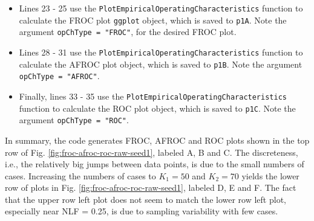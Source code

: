 \documentclass[
]{book}
\newenvironment{Shaded}{\begin{snugshade}}{\end{snugshade}}
\newcommand{\CommentTok}[1]{\textcolor[rgb]{0.56,0.35,0.01}{\textit{#1}}}
\newcommand{\DecValTok}[1]{\textcolor[rgb]{0.00,0.00,0.81}{#1}}
\newcommand{\NormalTok}[1]{#1}
\newcommand{\OperatorTok}[1]{\textcolor[rgb]{0.81,0.36,0.00}{\textbf{#1}}}
\begin{document}
\begin{Shaded}
\end{Shaded}

\begin{itemize}
\item
  Lines 23 - 25 use the \texttt{PlotEmpiricalOperatingCharacteristics} function to calculate the FROC plot \texttt{ggplot} object, which is saved to \texttt{p1A}. Note the argument \texttt{opChType\ =\ "FROC"}, for the desired FROC plot.
\item
  Lines 28 - 31 use the \texttt{PlotEmpiricalOperatingCharacteristics} function to calculate the AFROC plot object, which is saved to \texttt{p1B}. Note the argument \texttt{opChType\ =\ "AFROC"}.
\item
  Finally, lines 33 - 35 use the \texttt{PlotEmpiricalOperatingCharacteristics} function to calculate the ROC plot object, which is saved to \texttt{p1C}. Note the argument \texttt{opChType\ =\ "ROC"}.
\end{itemize}

In summary, the code generates FROC, AFROC and ROC plots shown in the top row of Fig. \ref{fig:froc-afroc-roc-raw-seed1}, labeled A, B and C. The discreteness, i.e., the relatively big jumps between data points, is due to the small numbers of cases. Increasing the numbers of cases to \(K_1 = 50\) and \(K_2 = 70\) yields the lower row of plots in Fig. \ref{fig:froc-afroc-roc-raw-seed1}, labeled D, E and F. The fact that the upper row left plot does not seem to match the lower row left plot, especially near NLF = 0.25, is due to sampling variability with few cases.
\end{document}
